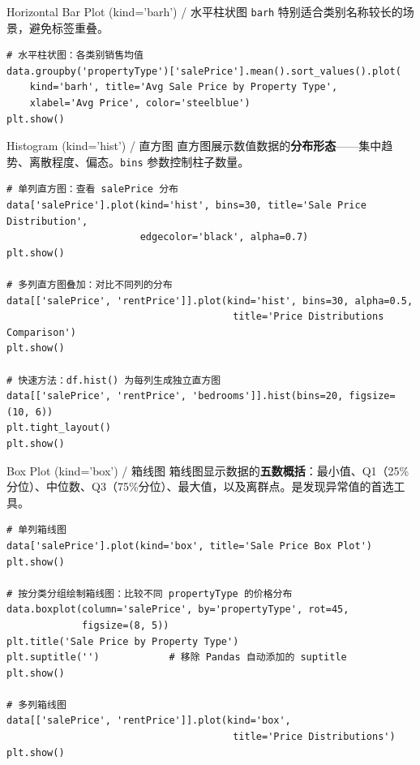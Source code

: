 \documentclass[11pt,a4paper]{report}
\let\oldtexttt\texttt
\renewcommand{\texttt}[1]{\textcolor{mainblue}{\oldtexttt{#1}}}
\begin{document}
\begin{examplebox}{Horizontal Bar Plot (kind='barh') / 水平柱状图}
    \texttt{barh} 特别适合类别名称较长的场景，避免标签重叠。
\begin{lstlisting}
# 水平柱状图：各类别销售均值
data.groupby('propertyType')['salePrice'].mean().sort_values().plot(
    kind='barh', title='Avg Sale Price by Property Type',
    xlabel='Avg Price', color='steelblue')
plt.show()
\end{lstlisting}
\end{examplebox}

\begin{examplebox}{Histogram (kind='hist') / 直方图}
    直方图展示数值数据的\textbf{分布形态}——集中趋势、离散程度、偏态。\texttt{bins} 参数控制柱子数量。
\begin{lstlisting}
# 单列直方图：查看 salePrice 分布
data['salePrice'].plot(kind='hist', bins=30, title='Sale Price Distribution',
                       edgecolor='black', alpha=0.7)
plt.show()

# 多列直方图叠加：对比不同列的分布
data[['salePrice', 'rentPrice']].plot(kind='hist', bins=30, alpha=0.5,
                                       title='Price Distributions Comparison')
plt.show()

# 快速方法：df.hist() 为每列生成独立直方图
data[['salePrice', 'rentPrice', 'bedrooms']].hist(bins=20, figsize=(10, 6))
plt.tight_layout()
plt.show()
\end{lstlisting}
\end{examplebox}

\begin{examplebox}{Box Plot (kind='box') / 箱线图}
    箱线图显示数据的\textbf{五数概括}：最小值、Q1（25\%分位）、中位数、Q3（75\%分位）、最大值，以及离群点。是发现异常值的首选工具。
\begin{lstlisting}
# 单列箱线图
data['salePrice'].plot(kind='box', title='Sale Price Box Plot')
plt.show()

# 按分类分组绘制箱线图：比较不同 propertyType 的价格分布
data.boxplot(column='salePrice', by='propertyType', rot=45,
             figsize=(8, 5))
plt.title('Sale Price by Property Type')
plt.suptitle('')            # 移除 Pandas 自动添加的 suptitle
plt.show()

# 多列箱线图
data[['salePrice', 'rentPrice']].plot(kind='box',
                                       title='Price Distributions')
plt.show()
\end{lstlisting}
\end{examplebox}
\end{document}

